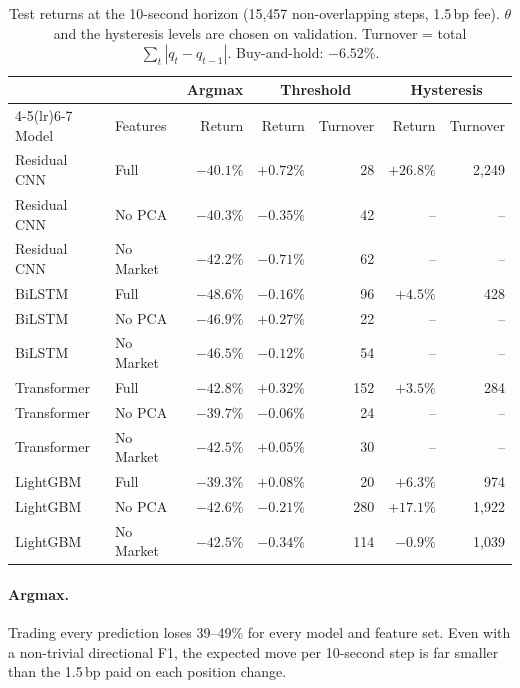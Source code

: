 \begin{table}[htbp]
\centering
\caption{Test returns at the 10-second horizon (15,457 non-overlapping steps, 1.5\,bp
fee). $\theta$ and the hysteresis levels are chosen on validation. Turnover = total
$\sum_t|q_t-q_{t-1}|$. Buy-and-hold: $-6.52\%$.}
\label{tab:trading}
\begin{tabular}{llrrrrr}
\toprule
 & & Argmax & \multicolumn{2}{c}{Threshold} & \multicolumn{2}{c}{Hysteresis} \\
\cmidrule(lr){4-5}\cmidrule(lr){6-7}
Model & Features & Return & Return & Turnover & Return & Turnover \\
\midrule
Residual CNN & Full      & $-40.1\%$ & $+0.72\%$ & 28  & $\mathbf{+26.8\%}$ & 2,249 \\
Residual CNN & No PCA    & $-40.3\%$ & $-0.35\%$ & 42  & -- & -- \\
Residual CNN & No Market & $-42.2\%$ & $-0.71\%$ & 62  & -- & -- \\
BiLSTM       & Full      & $-48.6\%$ & $-0.16\%$ & 96  & $+4.5\%$ & 428 \\
BiLSTM       & No PCA    & $-46.9\%$ & $+0.27\%$ & 22  & -- & -- \\
BiLSTM       & No Market & $-46.5\%$ & $-0.12\%$ & 54  & -- & -- \\
Transformer  & Full      & $-42.8\%$ & $+0.32\%$ & 152 & $+3.5\%$ & 284 \\
Transformer  & No PCA    & $-39.7\%$ & $-0.06\%$ & 24  & -- & -- \\
Transformer  & No Market & $-42.5\%$ & $+0.05\%$ & 30  & -- & -- \\
LightGBM     & Full      & $-39.3\%$ & $+0.08\%$ & 20  & $+6.3\%$ & 974 \\
LightGBM     & No PCA    & $-42.6\%$ & $-0.21\%$ & 280 & $+17.1\%$ & 1,922 \\
LightGBM     & No Market & $-42.5\%$ & $-0.34\%$ & 114 & $-0.9\%$ & 1,039 \\
\bottomrule
\end{tabular}
\end{table}

\paragraph{Argmax.} Trading every prediction loses 39--49\% for every model and feature
set. Even with a non-trivial directional F1, the expected move per 10-second step is far
smaller than the 1.5\,bp paid on each position change.

